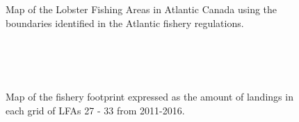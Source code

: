 \documentclass[11pt]{article}
\newcommand{\ebh}{\string~/bio.data/bio.lobster/figures/LFA3438Framework2019/} %
\begin{document}
\begin{landscape}
\begin{figure}
\centering
    \caption{Map of the Lobster Fishing Areas in Atlantic Canada using the boundaries identified in the Atlantic fishery regulations.}

\end{figure}
\end{landscape}

%


  \begin{figure}
        \centering
    \\
                \\
                \\
        
         \caption{Map of the fishery footprint expressed as the amount of landings in each grid of LFAs 27 - 33 from 2011-2016.}
        \end{figure}
\end{document}

